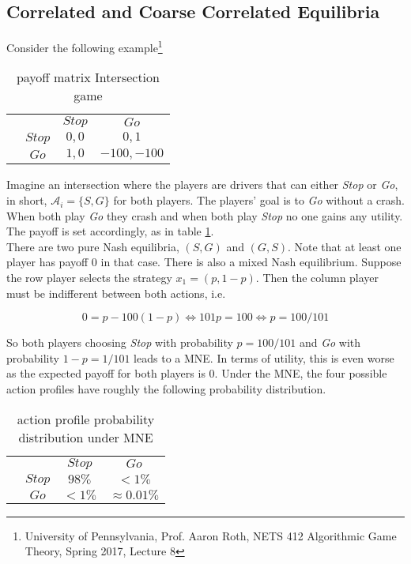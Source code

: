 \subsection{Correlated and Coarse Correlated Equilibria}\label{subsection:CEandCCE}

Consider the following example\footnote{University of Pennsylvania, Prof. Aaron Roth, NETS 412 Algorithmic Game Theory, Spring 2017, Lecture 8}

\begin{table}[H]\centering
\setlength{\extrarowheight}{2pt}
\begin{tabular}{cc|c|c|}
  & \multicolumn{1}{c}{} & \multicolumn{1}{c}{$Stop$}  & \multicolumn{1}{c}{$Go$} \\\cline{3-4}
  & $Stop$ & $0,0$ & $0,1$ \\\cline{3-4}
  & $Go$ & $1,0$ & $-100,-100$ \\\cline{3-4}
\end{tabular}\caption{\label{tab:payoffIntersectionfromFiniteGames}payoff matrix Intersection game}
\end{table}

Imagine an intersection where the players are drivers that can either \textit{Stop} or \textit{Go}, in short, $\mathcal{A}_i = \{S,G\}$ for both players. The players' goal is to \textit{Go} without a crash. When both play \textit{Go} they crash and when both play \textit{Stop} no one gains any utility. The payoff is set accordingly, as in table \ref{tab:payoffIntersectionfromFiniteGames}. \\

There are two pure Nash equilibria, $(S,G)$ and $(G,S)$. Note that at least one player has payoff $0$ in that case. There is also a mixed Nash equilibrium. Suppose the row player selects the strategy $x_1 = (p,1-p)$. Then the column player must be indifferent between both actions, i.e. 

\begin{equation*}
    0 = p - 100(1-p) \iff 101p = 100 \iff p = 100/101
\end{equation*}

So both players choosing \textit{Stop} with probability $p = 100/101$ and \textit{Go} with probability $1-p = 1/101$  leads to a MNE. In terms of utility, this is even worse as the expected payoff for both players is $0$. Under the MNE, the four possible action profiles have roughly the following probability distribution. 

\begin{table}[H]\centering
\setlength{\extrarowheight}{2pt}
\begin{tabular}{cc|c|c|}
  & \multicolumn{1}{c}{} & \multicolumn{1}{c}{$Stop$}  & \multicolumn{1}{c}{$Go$} \\\cline{3-4}
  & $Stop$ & $98\%$ & $<1\%$ \\\cline{3-4}
  & $Go$ & $<1\%$ & $\approx 0.01\%$ \\\cline{3-4}
\end{tabular}\caption{\label{tab:probabilityUnderMNE}action profile probability distribution under MNE}
\end{table}

